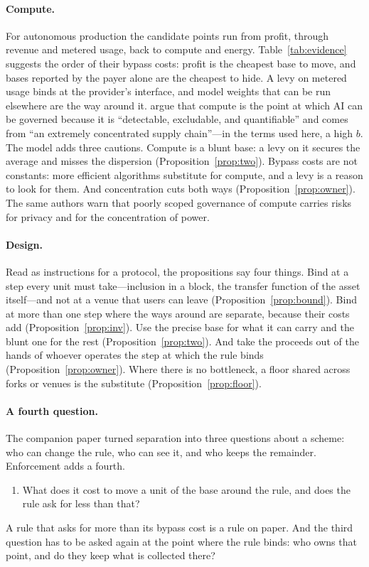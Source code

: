 \paragraph{Compute.} For autonomous production the candidate points run from profit,
through revenue and metered usage, back to compute and energy. Table~\ref{tab:evidence}
suggests the order of their bypass costs: profit is the cheapest base to move, and bases
reported by the payer alone are the cheapest to hide. A levy on metered usage binds at
the provider's interface, and model weights that can be run elsewhere are the way around
it. \citet{SastryEtAl2024} argue that
compute is the point at which AI can be governed because it is ``detectable, excludable,
and quantifiable'' and comes from ``an extremely concentrated supply chain''---in the
terms used here, a high $b$. The model adds three cautions. Compute is a blunt base: a
levy on it secures the average and misses the dispersion
(Proposition~\ref{prop:two}). Bypass costs are not constants: more efficient algorithms
substitute for compute, and a levy is a reason to look for them. And concentration cuts
both ways (Proposition~\ref{prop:owner}). The same authors warn that poorly scoped
governance of compute carries risks for privacy and for the concentration of power.

\paragraph{Design.} Read as instructions for a protocol, the propositions say four
things. Bind at a step every unit must take---inclusion in a block, the transfer function
of the asset itself---and not at a venue that users can leave
(Proposition~\ref{prop:bound}). Bind at more than one step where the ways around are
separate, because their costs add (Proposition~\ref{prop:inv}). Use the precise base for
what it can carry and the blunt one for the rest (Proposition~\ref{prop:two}). And take
the proceeds out of the hands of whoever operates the step at which the rule binds
(Proposition~\ref{prop:owner}). Where there is no bottleneck, a floor shared across forks
or venues is the substitute (Proposition~\ref{prop:floor}).

\paragraph{A fourth question.} The companion paper turned separation into three questions
about a scheme: who can change the rule, who can see it, and who keeps the remainder.
Enforcement adds a fourth.
\begin{enumerate}[label=Q\arabic*.,leftmargin=2.6em,start=4]
\item What does it cost to move a unit of the base around the rule, and does the rule ask
      for less than that?
\end{enumerate}
A rule that asks for more than its bypass cost is a rule on paper. And the third question
has to be asked again at the point where the rule binds: who owns that point, and do they
keep what is collected there?

